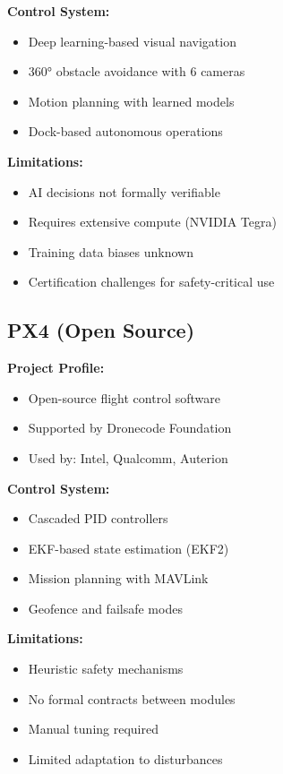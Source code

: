 \textbf{Control System:}
\begin{itemize}
    \item Deep learning-based visual navigation
    \item 360° obstacle avoidance with 6 cameras
    \item Motion planning with learned models
    \item Dock-based autonomous operations
\end{itemize}

\textbf{Limitations:}
\begin{itemize}
    \item AI decisions not formally verifiable
    \item Requires extensive compute (NVIDIA Tegra)
    \item Training data biases unknown
    \item Certification challenges for safety-critical use
\end{itemize}

\subsection{PX4 (Open Source)}

\textbf{Project Profile:}
\begin{itemize}
    \item Open-source flight control software
    \item Supported by Dronecode Foundation
    \item Used by: Intel, Qualcomm, Auterion
\end{itemize}

\textbf{Control System:}
\begin{itemize}
    \item Cascaded PID controllers
    \item EKF-based state estimation (EKF2)
    \item Mission planning with MAVLink
    \item Geofence and failsafe modes
\end{itemize}

\textbf{Limitations:}
\begin{itemize}
    \item Heuristic safety mechanisms
    \item No formal contracts between modules
    \item Manual tuning required
    \item Limited adaptation to disturbances
\end{itemize}

